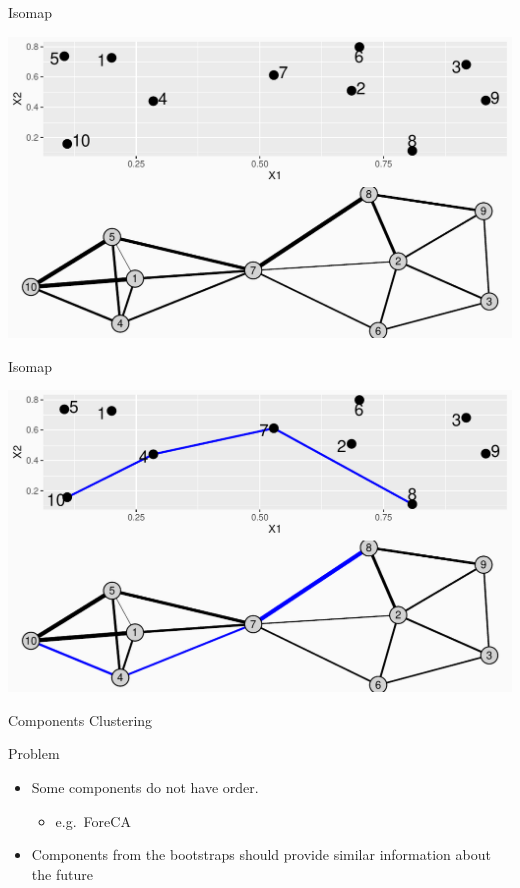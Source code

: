 \documentclass[14pt,ignorenonframetext,]{beamer}
\providecommand{\tightlist}{%
  \setlength{\itemsep}{0pt}\setlength{\parskip}{0pt}}
\begin{document}
\begin{frame}{Isomap}
\protect\hypertarget{isomap-1}{}
\begin{center}
\includegraphics[width=\linewidth]{plot/p_isomap1}
\end{center}
\end{frame}

\begin{frame}{Isomap}
\protect\hypertarget{isomap-2}{}
\begin{center}
\includegraphics[width=\linewidth]{plot/p_isomap2}
\end{center}
\end{frame}

\begin{frame}{Components Clustering}
\protect\hypertarget{components-clustering}{}
\begin{block}{Problem}
\protect\hypertarget{problem}{}
\begin{itemize}
\tightlist
\item
  Some components do not have order.

  \begin{itemize}
  \tightlist
  \item
    e.g.~ForeCA
  \end{itemize}
\item
  Components from the bootstraps should provide similar information
  about the future
\end{itemize}
\end{block}
\end{frame}
\end{document}
